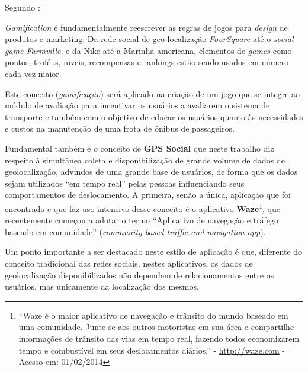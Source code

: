 Segundo :
\begin{citacao}
    \textit{Gamification} é fundamentalmente reescrever as regras de jogos para \textit{design} de produtos e marketing. Da rede social de geo localização \textit{FourSquare} até o \textit{social game Farmville}, e da Nike até a Marinha americana, elementos de \textit{games} como pontos, troféus, níveis, recompensas e rankings estão sendo usados em número cada vez maior.
\end{citacao}
	    
Este conceito (\textit{gamificação}) será aplicado na criação de um jogo que se integre ao módulo de avaliação para incentivar os usuários a avaliarem o sistema de transporte e também com o objetivo de educar os usuários quanto às necessidades e custos na manutenção de uma frota de ônibus de passageiros.

Fundamental também é o conceito de \textbf{GPS Social} que neste trabalho diz respeito à simultânea coleta e disponibilização de grande volume de dados de geolocalização, advindos de uma grande base de usuários, de forma que os dados sejam utilizados ``em tempo real'' pelas pessoas influenciando seus comportamentos de deslocamento. A primeira, senão a única, aplicação que foi encontrada e que faz uso intensivo desse conceito é o aplicativo \textbf{Waze}\footnote{``Waze é o maior aplicativo de navegação e trânsito do mundo baseado em uma comunidade. Junte-se aos outros motoristas em sua área e compartilhe informações de trânsito das vias em tempo real, fazendo todos economizarem tempo e combustível em seus deslocamentos diários.'' - \url{http://waze.com} - Acesso em: 01/02/2014}, que recentemente começou a adotar o termo ``Aplicativo de navegação e tráfego baseado em comunidade'' (\textit{community-based traffic and navigation app}).

Um ponto importante a ser destacado neste estilo de aplicação é que, diferente do conceito tradicional das redes sociais, nestes aplicativos, os dados de geolocalização disponibilizados não dependem de relacionamentos entre os usuários, mas unicamente da localização dos mesmos.

